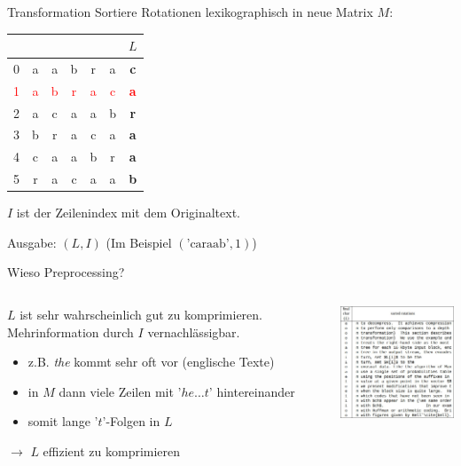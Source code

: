 \documentclass[ngerman,aspectratio=169,10pt]{beamer}
\newcommand{\red}[1]{\textcolor{red}{#1}}
\begin{document}
\begin{frame}{Transformation}
    Sortiere Rotationen lexikographisch in neue Matrix $M$:\\[20pt]
    
    \begin{tabular}{l|c c c c c c}
        &&&&&&$L$\\
        \hline
        0&a\vline&a&b&r&a&\textbf{c}\\
        \red{1}&\red{a}&\red{b}&\red{r}&\red{a}&\red{c}&\red{\textbf{a}}\vline\\
        2&a&c&a\vline&a&b&\textbf{r}\\
        3&b&r&a&c&a\vline&\textbf{a}\\
        4&c&a\vline&a&b&r&\textbf{a}\\
        5&r&a&c&a\vline&a&\textbf{b}\\
    \end{tabular}
    
    $I$ ist der Zeilenindex mit dem Originaltext.
    
    Ausgabe: $(L, I)$ (Im Beispiel $(\text{'caraab'}, 1)$)
\end{frame}

\begin{frame}{Wieso Preprocessing?}
	\begin{columns}
	    \begin{column}{0.46\textwidth}
	        $L$ ist sehr wahrscheinlich gut zu komprimieren. Mehrinformation durch $I$ vernachlässigbar.
	        \begin{itemize}
	            \item z.B. \textit{the} kommt sehr oft vor (englische Texte)
	            \item in $M$ dann viele Zeilen mit '$he\ldots t$' hintereinander
	            \item somit lange '$t$'-Folgen in $L$
	        \end{itemize}
	        
	        $\longrightarrow$ $L$ effizient zu komprimieren
	    \end{column}
	    \begin{column}{0.46\textwidth}
	        \includegraphics[width=200px]{graphics/table.jpg}
	    \end{column}
    \end{columns}
\end{frame}
\end{document}
